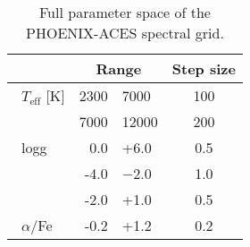 
\begin{table}
    \centering 
    \caption{Full parameter space of the {PHOENIX-ACES} spectral grid.}
    \begin{tabular}{lr@{ -- }lc}    %
        \toprule
        & \multicolumn{2}{c}{Range}       & Step size\\
        \midrule
        \ \(T_{\textrm{eff}}\) [K] &  2300 & 7000  & 100 \\
        &  7000 & 12000 & 200 \\ 
        \  logg     &  0.0 & +6.0   & 0.5 \\ 
        \ \feh{}   &  -4.0 & $-$2.0  & 1.0 \\    %
        &  -2.0 & +1.0  & 0.5 \\  
        \  \(\alpha\)/Fe &  -0.2 & +1.2  & 0.2 \\
        \bottomrule
    \end{tabular}
    \label{tab:phoenix}
\end{table}